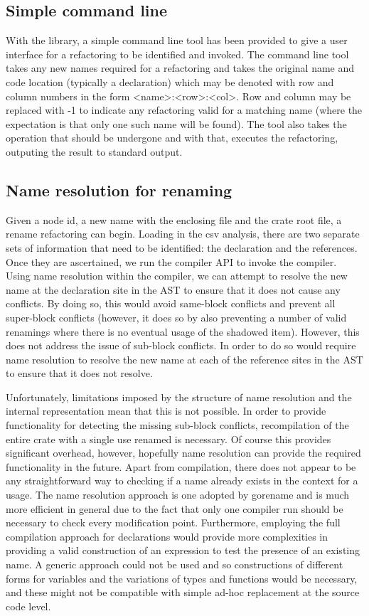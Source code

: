 \subsection{Simple command line}
With the library, a simple command line tool has been provided to give a user interface for a refactoring to be identified and invoked. The command line tool takes any new names required for a refactoring and takes the original name and code location (typically a declaration) which may be denoted with row and column numbers in the form \textless{}name\textgreater{}:\textless{}row\textgreater{}:\textless{}col\textgreater{}. Row and column may be replaced with -1 to indicate any refactoring valid for a matching name (where the expectation is that only one such name will be found). The tool also takes the operation that should be undergone and with that, executes the refactoring, outputing the result to standard output.

\subsection{Name resolution for renaming}
Given a node id, a new name with the enclosing file and the crate root file, a rename refactoring can begin. Loading in the csv analysis, there are two separate sets of information that need to be identified: the declaration and the references. Once they are ascertained, we run the compiler API to invoke the compiler. Using name resolution within the compiler, we can attempt to resolve the new name at the declaration site in the AST to ensure that it does not cause any conflicts. By doing so, this would avoid same-block conflicts and prevent all super-block conflicts (however, it does so by also preventing a number of valid renamings where there is no eventual usage of the shadowed item). However, this does not address the issue of sub-block conflicts. In order to do so would require name resolution to resolve the new name at each of the reference sites in the AST to ensure that it does not resolve. 

Unfortunately, limitations imposed by the structure of name resolution and the internal representation mean that this is not possible. In order to provide functionality for detecting the missing sub-block conflicts, recompilation of the entire crate with a single use renamed is necessary. Of course this provides significant overhead, however, hopefully name resolution can provide the required functionality in the future. Apart from compilation, there does not appear to be any straightforward way to checking if a name already exists in the context for a usage. The name resolution approach is one adopted by gorename \cite{gorename15} and is much more efficient in general due to the fact that only one compiler run should be necessary to check every modification point. Furthermore, employing the full compilation approach for declarations would provide more complexities in providing a valid construction of an expression to test the presence of an existing name. A generic approach could not be used and so constructions of different forms for variables and the variations of types and functions would be necessary, and these might not be compatible with simple ad-hoc replacement at the source code level.

